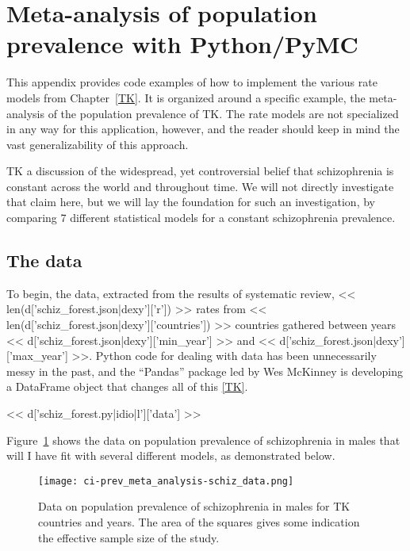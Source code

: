 \section{Meta-analysis of population prevalence with Python/PyMC}

This appendix provides code examples of how to implement the various
rate models from Chapter~\ref{TK}.  It is organized around a specific
example, the meta-analysis of the population prevalence of TK.  The
rate models are not specialized in any way for this application,
however, and the reader should keep in mind the vast generalizability
of this approach.

TK a discussion of the widespread, yet controversial belief that
schizophrenia is constant across the world and throughout time.  We
will not directly investigate that claim here, but we will lay the
foundation for such an investigation, by comparing 7 different
statistical models for a constant schizophrenia prevalence.

\subsection{The data}
To begin, the data, extracted from the results of systematic review,
<< len(d['schiz_forest.json|dexy']['r']) >> rates from <<
len(d['schiz_forest.json|dexy']['countries']) >> countries gathered
between years << d['schiz_forest.json|dexy']['min_year'] >> and <<
d['schiz_forest.json|dexy']['max_year'] >>.  Python code for dealing
with data has been unnecessarily messy in the past, and the ``Pandas''
package led by Wes McKinney is developing a DataFrame object that
changes all of this \ref{TK}.

<< d['schiz_forest.py|idio|l']['data'] >>


Figure~\ref{fig:ci-prev_meta_analysis-schiz_data} shows the data on
population prevalence of schizophrenia in males that will I have fit with
several different models, as demonstrated below.

\begin{figure}
\begin{center}
\texttt{[image: ci-prev\_meta\_analysis-schiz\_data.png]}
\end{center}
\caption{Data on population prevalence of schizophrenia in males for
  TK countries and years.  The area of the squares gives some indication the
  effective sample size of the study.}
\label{fig:ci-prev_meta_analysis-schiz_data}
\end{figure}


